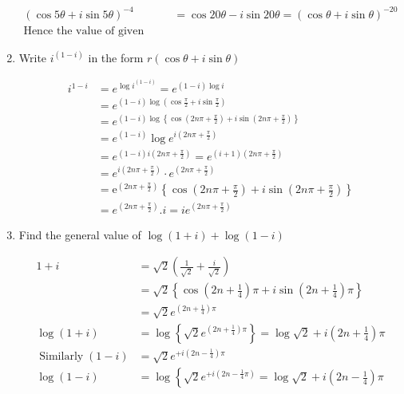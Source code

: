 \begin{enumerate}[label=\color{ocre}\textbf{\arabic*.}]
\begin{answer}
\begin{align*}
(\cos 5 \theta+i \sin 5 \theta)^{-4}&=\cos 20 \theta-i \sin 20 \theta=(\cos \theta+i \sin \theta)^{-20}\\
\text{Hence the value of given expression is 1}
\end{align*}
\end{answer}
\item Write $i^{(1-i)}$ in the form $r(\cos \theta+i \sin \theta)$
\begin{answer}
	\begin{align*}
		i^{1-i} &=e^{\log i^{(1-i)}}=e^{(1-i) \log i} \\
		&=e^{(1-i) \log \left(\cos \frac{\pi}{2}+i \sin \frac{\pi}{2}\right)}\\
		&=e^{(1-i) \log \left\{\cos \left(2 n \pi+\frac{\pi}{2}\right)+i \sin \left(2 n \pi+\frac{\pi}{2}\right)\right\}} \\
		&=e^{(1-i)} \log e^{i\left(2 n \pi+\frac{\pi}{2}\right)} \\
		&=e^{(1-i) i\left(2 n \pi+\frac{\pi}{2}\right)}=e^{(i+1)\left(2 n \pi+\frac{\pi}{2}\right)} \\
		&=e^{i\left(2 n \pi+\frac{\pi}{2}\right)} \cdot e^{\left(2 n \pi+\frac{\pi}{2}\right)} \\
		&=\mathrm{e}^{\left(2 n \pi+\frac{\pi}{2}\right)}\left\{\cos \left(2 n \pi+\frac{\pi}{2}\right)+i \sin \left(2 n \pi+\frac{\pi}{2}\right)\right\} \\
		&=e^{\left(2 n \pi+\frac{\pi}{2}\right)} . i=i e^{\left(2 n \pi+\frac{\pi}{2}\right)}
	\end{align*}
\end{answer}
\item Find the general value of $\log (1+i)+\log (1-i)$
\begin{answer}
	\begin{align*}
	1+i&=\sqrt{2}\left(\frac{1}{\sqrt{2}}+\frac{i}{\sqrt{2}}\right)\\
		&=\sqrt{2}\left\{\cos \left(2 n+\frac{1}{4}\right) \pi+i \sin \left(2 n+\frac{1}{4}\right) \pi\right\} \\
		&=\sqrt{2} e^{\left(2 n+\frac{1}{4}\right) \pi} \\
		\log (1+i) &=\log \left\{\sqrt{2} e^{\left(2 n+\frac{1}{4}\right) \pi}\right\}=\log \sqrt{2}+i\left(2 n+\frac{1}{4}\right) \pi \\
		\operatorname{Similarly}(1-i) &=\sqrt{2} e^{+i\left(2 n-\frac{1}{4}\right) \pi} \\
		\log (1-i) &=\log \left\{\sqrt{2} e^{+i\left(2 n-\frac{1}{4} \pi\right)}=\log \sqrt{2}+i\left(2 n-\frac{1}{4}\right) \pi\right.\\

\end{align*}
\end{answer}
\end{enumerate}
